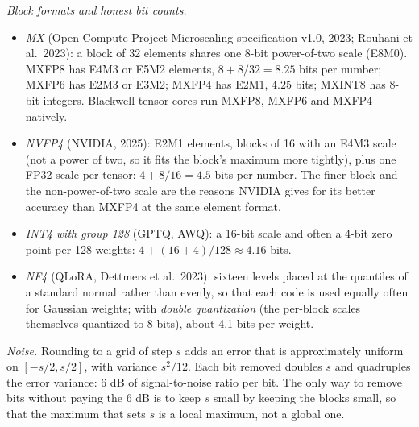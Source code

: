\documentclass[11pt,letterpaper]{article}
\begin{document}
\emph{Block formats and honest bit counts.}
\begin{itemize}
  \item \emph{MX} (Open Compute Project Microscaling specification v1.0, 2023; Rouhani et al.\ 2023): a block of 32 elements shares one 8-bit power-of-two scale (E8M0). MXFP8 has E4M3 or E5M2 elements, $8+8/32=8.25$ bits per number; MXFP6 has E2M3 or E3M2; MXFP4 has E2M1, $4.25$ bits; MXINT8 has 8-bit integers. Blackwell tensor cores run MXFP8, MXFP6 and MXFP4 natively.
  \item \emph{NVFP4} (NVIDIA, 2025): E2M1 elements, blocks of 16 with an E4M3 scale (not a power of two, so it fits the block's maximum more tightly), plus one FP32 scale per tensor: $4+8/16=4.5$ bits per number. The finer block and the non-power-of-two scale are the reasons NVIDIA gives for its better accuracy than MXFP4 at the same element format.
  \item \emph{INT4 with group 128} (GPTQ, AWQ): a 16-bit scale and often a 4-bit zero point per 128 weights: $4+(16+4)/128\approx4.16$ bits.
  \item \emph{NF4} (QLoRA, Dettmers et al.\ 2023): sixteen levels placed at the quantiles of a standard normal rather than evenly, so that each code is used equally often for Gaussian weights; with \emph{double quantization} (the per-block scales themselves quantized to 8 bits), about 4.1 bits per weight.
\end{itemize}

\emph{Noise.} Rounding to a grid of step $s$ adds an error that is approximately uniform on $[-s/2,s/2]$, with variance $s^2/12$. Each bit removed doubles $s$ and quadruples the error variance: 6 dB of signal-to-noise ratio per bit. The only way to remove bits without paying the 6 dB is to keep $s$ small by keeping the blocks small, so that the maximum that sets $s$ is a local maximum, not a global one.
\end{document}
